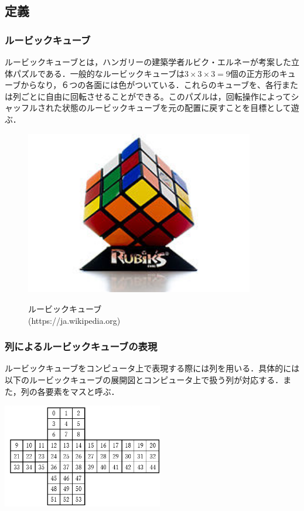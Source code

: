 \documentclass[titlepage]{jarticle}
\begin{document}
\subsection{定義}
\subsubsection{ルービックキューブ}
ルービックキューブとは，ハンガリーの建築学者ルビク・エルネーが考案した立体パズルである．一般的なルービックキューブは\(3\times 3\times 3=9\)個の正方形のキューブからなり，６つの各面には色がついている．これらのキューブを、各行または列ごとに自由に回転させることができる。このパズルは，回転操作によってシャッフルされた状態のルービックキューブを元の配置に戻すことを目標として遊ぶ．\\

\begin{figure}
  \centering
  \includegraphics[width=10cm]{./tex_pic/rubik-cube.jpg}\\
  \caption{ルービックキューブ\\(https://ja.wikipedia.org)}
\end{figure}

\subsubsection{列によるルービックキューブの表現}
ルービックキューブをコンピュータ上で表現する際には列を用いる．具体的には以下のルービックキューブの展開図とコンピュータ上で扱う列が対応する．また，列の各要素をマスと呼ぶ．\\
\begin{center}
  \includegraphics[width=7cm]{./tex_pic/seq.jpg}\\
\end{center}
\end{document}
